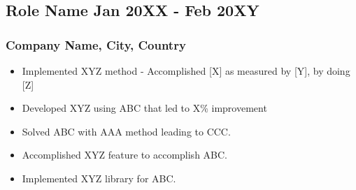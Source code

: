 \documentclass[11pt]{article}
\begin{document}
    \subsection{Role Name \hfill \normalfont Jan 20XX - Feb 20XY}
    \subsubsection{Company Name, City, Country}
    \begin{itemize}
        \item[\checkmark] Implemented XYZ method - Accomplished [X] as measured by [Y], by doing [Z] 
        \item[\checkmark]  Developed XYZ using ABC that led to X\% improvement 
        \item[\checkmark] Solved ABC with AAA method leading to CCC.
        \item[\checkmark]  Accomplished XYZ feature to accomplish ABC.
        \item[\checkmark]  Implemented XYZ library for ABC.
    \end{itemize}
    
\end{document}

